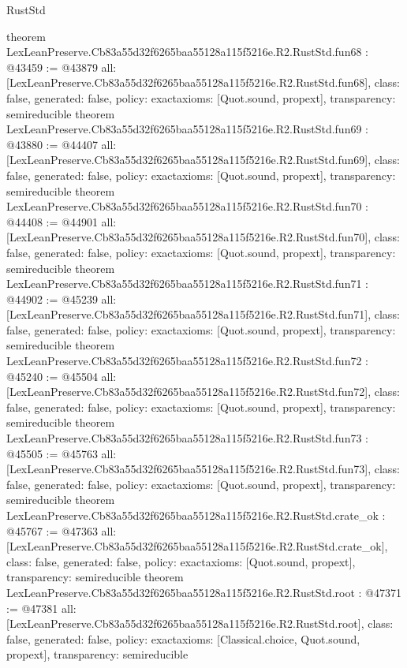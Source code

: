\begin{lexlean}{RustStd}
\begin{coremodule}
{}
theorem LexLeanPreserve.Cb83a55d32f6265baa55128a115f5216e.R2.RustStd.fun68 : @43459 := @43879 {
  all: [LexLeanPreserve.Cb83a55d32f6265baa55128a115f5216e.R2.RustStd.fun68],
  class: false,
  generated: false,
  policy: exact{axioms: [Quot.sound, propext]},
  transparency: semireducible
}
theorem LexLeanPreserve.Cb83a55d32f6265baa55128a115f5216e.R2.RustStd.fun69 : @43880 := @44407 {
  all: [LexLeanPreserve.Cb83a55d32f6265baa55128a115f5216e.R2.RustStd.fun69],
  class: false,
  generated: false,
  policy: exact{axioms: [Quot.sound, propext]},
  transparency: semireducible
}
theorem LexLeanPreserve.Cb83a55d32f6265baa55128a115f5216e.R2.RustStd.fun70 : @44408 := @44901 {
  all: [LexLeanPreserve.Cb83a55d32f6265baa55128a115f5216e.R2.RustStd.fun70],
  class: false,
  generated: false,
  policy: exact{axioms: [Quot.sound, propext]},
  transparency: semireducible
}
theorem LexLeanPreserve.Cb83a55d32f6265baa55128a115f5216e.R2.RustStd.fun71 : @44902 := @45239 {
  all: [LexLeanPreserve.Cb83a55d32f6265baa55128a115f5216e.R2.RustStd.fun71],
  class: false,
  generated: false,
  policy: exact{axioms: [Quot.sound, propext]},
  transparency: semireducible
}
theorem LexLeanPreserve.Cb83a55d32f6265baa55128a115f5216e.R2.RustStd.fun72 : @45240 := @45504 {
  all: [LexLeanPreserve.Cb83a55d32f6265baa55128a115f5216e.R2.RustStd.fun72],
  class: false,
  generated: false,
  policy: exact{axioms: [Quot.sound, propext]},
  transparency: semireducible
}
theorem LexLeanPreserve.Cb83a55d32f6265baa55128a115f5216e.R2.RustStd.fun73 : @45505 := @45763 {
  all: [LexLeanPreserve.Cb83a55d32f6265baa55128a115f5216e.R2.RustStd.fun73],
  class: false,
  generated: false,
  policy: exact{axioms: [Quot.sound, propext]},
  transparency: semireducible
}
theorem LexLeanPreserve.Cb83a55d32f6265baa55128a115f5216e.R2.RustStd.crate_ok : @45767 := @47363 {
  all: [LexLeanPreserve.Cb83a55d32f6265baa55128a115f5216e.R2.RustStd.crate_ok],
  class: false,
  generated: false,
  policy: exact{axioms: [Quot.sound, propext]},
  transparency: semireducible
}
theorem LexLeanPreserve.Cb83a55d32f6265baa55128a115f5216e.R2.RustStd.root : @47371 := @47381 {
  all: [LexLeanPreserve.Cb83a55d32f6265baa55128a115f5216e.R2.RustStd.root],
  class: false,
  generated: false,
  policy: exact{axioms: [Classical.choice, Quot.sound, propext]},
  transparency: semireducible
}


\end{coremodule}
\end{lexlean}
